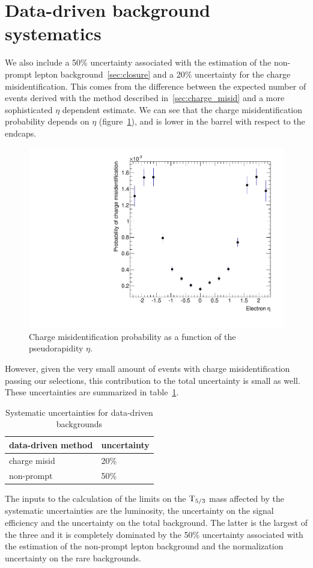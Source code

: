 \section{Data-driven background systematics}
We also include a 50\% uncertainty associated with the
estimation of the non-prompt lepton background~\ref{sec:closure}
and a 20\% uncertainty for the charge misidentification. This comes from the
difference between the expected number of events derived with the method
described in~\ref{sec:charge_misid} and a more sophisticated $\eta$
dependent estimate. We can see that the charge misidentification probability
depends on $\eta$ (figure~\ref{fig:charge_misid_eta}), and is lower in the
barrel with respect to the endcaps.
\begin{figure}[htb]
    \centering
    \includegraphics[width=.7\textwidth]{images/pdf/h_MisIDProbvsEta}
    \caption{Charge misidentification probability as a function of the
    pseudorapidity $\eta$.}
    \label{fig:charge_misid_eta}
\end{figure}
However, given the very small amount of events with charge misidentification
passing our selections, this contribution to the total uncertainty is small
as well.
These uncertainties are summarized in
table~\ref{tab:data_driven_syst}.
\begin{table}[h]
    \centering
    \begin{tabular}{ll}
        \toprule
        data-driven method & uncertainty \\
        \midrule
        charge misid & 20\%\\
        non-prompt & 50\%\\
        \bottomrule
    \end{tabular}
    \caption{Systematic uncertainties for data-driven backgrounds}
    \label{tab:data_driven_syst}
\end{table}

The inputs to the calculation of the limits on the $\mathrm{T}_{5/3}$ mass affected by the systematic uncertainties are the luminosity, the uncertainty on the signal efficiency 
and the uncertainty on the total background. The latter is the largest of
the three and it is completely dominated by the 50\% uncertainty associated with the estimation of the 
non-prompt lepton background and the normalization uncertainty on the rare backgrounds.


